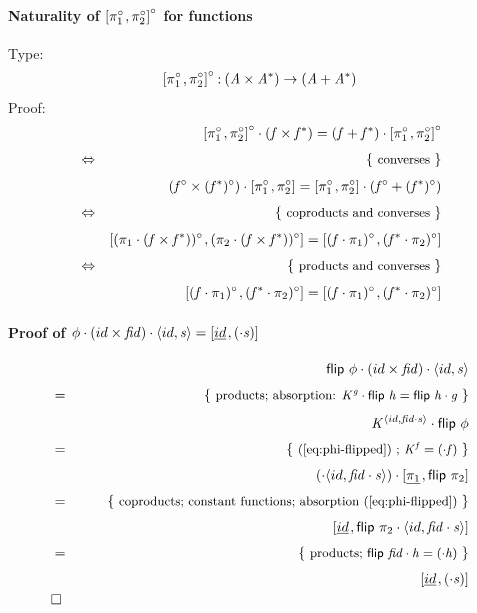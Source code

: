 \documentclass{elsarticle}
\newcommand{\Conid}[1]{\mathit{#1}}
\newcommand{\Varid}[1]{\mathit{#1}}
\def\alt#1#2{\mathopen{[}#1\hskip 1pt,#2\mathclose{]}}
\def\comp{ \mathbin{\cdot} }
\def\conv#1{#1^\circ}
\def\just#1#2{\\ &#1& \rule{2em}{0pt} \{ \mbox{\rule[-.7em]{0pt}{1.8em} \small #2 \/} \} \nonumber\\ && }
\def\p#1{\pi_{#1}}
\def\qed{\\&\Box&\nonumber}
\def\conj#1#2{\mathopen{\langle} #1, #2 \mathclose{\rangle}}
\let\kons=\underline
\def\start{&&}
\def\equiv{\Leftrightarrow}
\begin{document}
\paragraph{Naturality of \ensuremath{\conv{\alt{\conv{\p1}}{\conv{\p2}}}} for functions}
Type:
\begin{eqnarray*}
	\ensuremath{\conv{\alt{\conv{\p1}}{\conv{\p2}}}\mathbin{:}(\Conid{A} \times {\Conid{A}}^{*})\to (\Conid{A}\mathbin{+}{\Conid{A}}^{*})}
\end{eqnarray*}
Proof:
\begin{eqnarray*}
\start
	\ensuremath{\conv{\alt{\conv{\p1}}{\conv{\p2}}} \comp (\Varid{f} \times {\Varid{f}}^{*})\mathrel{=}(\Varid{f}\mathbin{+}{\Varid{f}}^{*}) \comp \conv{\alt{\conv{\p1}}{\conv{\p2}}}}
%
\just\equiv{converses}
%
	\ensuremath{(\conv{\Varid{f}} \times \conv{({\Varid{f}}^{*})}) \comp \alt{\conv{\p1}}{\conv{\p2}}\mathrel{=}\alt{\conv{\p1}}{\conv{\p2}} \comp (\conv{\Varid{f}}\mathbin{+}\conv{({\Varid{f}}^{*})})}
%
\just\equiv{coproducts and converses}
%
	\ensuremath{\alt{\conv{(\p1 \comp (\Varid{f} \times {\Varid{f}}^{*}))}}{\conv{(\p2 \comp (\Varid{f} \times {\Varid{f}}^{*}))}}\mathrel{=}\alt{\conv{(\Varid{f} \comp \p1)}}{\conv{({\Varid{f}}^{*} \comp \p2)}}}
%
\just\equiv{products and converses}
%
	\ensuremath{\alt{\conv{(\Varid{f} \comp \p1)}}{\conv{({\Varid{f}}^{*} \comp \p2)}}\mathrel{=}\alt{\conv{(\Varid{f} \comp \p1)}}{\conv{({\Varid{f}}^{*} \comp \p2)}}}
\end{eqnarray*}
%

\paragraph{Proof of \ensuremath{\phi  \comp ({id} \times \Varid{fid}) \comp \conj{{id}}{\Varid{s}}\mathrel{=}\alt{\kons{{id}}}{( \comp \Varid{s})}}}
\label{pg:211024a}
\small
\begin{eqnarray*}
\start
	\ensuremath{\mathsf{flip}\ \phi  \comp ({id} \times \Varid{fid}) \comp \conj{{id}}{\Varid{s}}}
%
\just={ products; absorption: \ensuremath{{\Conid{K}}^{\Varid{g}} \comp \mathsf{flip}\ \Varid{h}\mathrel{=}\mathsf{flip}\ \Varid{h} \comp \Varid{g}}} %
%
	\ensuremath{{\Conid{K}}^{\conj{{id}}{\Varid{fid} \comp \Varid{s}}} \comp \mathsf{flip}\ \phi }
%
\just={ (\ref{eq:phi-flipped}) ; \ensuremath{{\Conid{K}}^{\Varid{f}}\mathrel{=}( \comp \Varid{f})} }
%
	\ensuremath{( \comp \conj{{id}}{\Varid{fid} \comp \Varid{s}}) \comp \alt{\kons{\p1}}{\mathsf{flip}\ \p2}}
%
\just={ coproducts; constant functions; absorption (\ref{eq:phi-flipped}) }
%
	\ensuremath{\alt{\kons{{id}}}{\mathsf{flip}\ \p2 \comp \conj{{id}}{\Varid{fid} \comp \Varid{s}}}}
%
\just={ products; \ensuremath{\mathsf{flip}\ \Varid{fid} \comp \Varid{h}\mathrel{=}( \comp \Varid{h})} } %
%
%
%
	\ensuremath{\alt{\kons{{id}}}{( \comp \Varid{s})}}
\qed
\end{eqnarray*}
%
\end{document}
